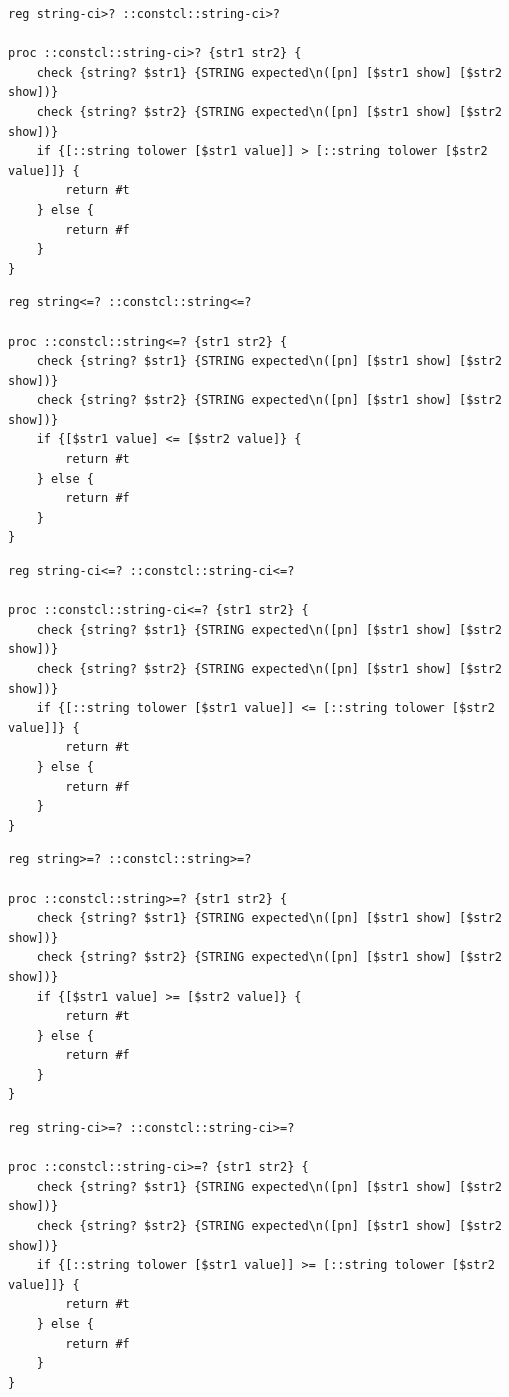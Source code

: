 \documentclass[twoside,9pt]{report}
\begin{document}
\noindent\makebox[\linewidth]{\rule{\linewidth}{0.4pt}}
\noindent\makebox[\linewidth]{\rule{\linewidth}{0.4pt}}
\begin{lstlisting}
reg string-ci>? ::constcl::string-ci>?
 
proc ::constcl::string-ci>? {str1 str2} {
    check {string? $str1} {STRING expected\n([pn] [$str1 show] [$str2 show])}
    check {string? $str2} {STRING expected\n([pn] [$str1 show] [$str2 show])}
    if {[::string tolower [$str1 value]] > [::string tolower [$str2 value]]} {
        return #t
    } else {
        return #f
    }
}
\end{lstlisting}
\noindent\makebox[\linewidth]{\rule{\linewidth}{0.4pt}}
\noindent\makebox[\linewidth]{\rule{\linewidth}{0.4pt}}
\begin{lstlisting}
reg string<=? ::constcl::string<=?
 
proc ::constcl::string<=? {str1 str2} {
    check {string? $str1} {STRING expected\n([pn] [$str1 show] [$str2 show])}
    check {string? $str2} {STRING expected\n([pn] [$str1 show] [$str2 show])}
    if {[$str1 value] <= [$str2 value]} {
        return #t
    } else {
        return #f
    }
}
\end{lstlisting}
\noindent\makebox[\linewidth]{\rule{\linewidth}{0.4pt}}
\noindent\makebox[\linewidth]{\rule{\linewidth}{0.4pt}}
\begin{lstlisting}
reg string-ci<=? ::constcl::string-ci<=?
 
proc ::constcl::string-ci<=? {str1 str2} {
    check {string? $str1} {STRING expected\n([pn] [$str1 show] [$str2 show])}
    check {string? $str2} {STRING expected\n([pn] [$str1 show] [$str2 show])}
    if {[::string tolower [$str1 value]] <= [::string tolower [$str2 value]]} {
        return #t
    } else {
        return #f
    }
}
\end{lstlisting}
\noindent\makebox[\linewidth]{\rule{\linewidth}{0.4pt}}
\noindent\makebox[\linewidth]{\rule{\linewidth}{0.4pt}}
\begin{lstlisting}
reg string>=? ::constcl::string>=?
 
proc ::constcl::string>=? {str1 str2} {
    check {string? $str1} {STRING expected\n([pn] [$str1 show] [$str2 show])}
    check {string? $str2} {STRING expected\n([pn] [$str1 show] [$str2 show])}
    if {[$str1 value] >= [$str2 value]} {
        return #t
    } else {
        return #f
    }
}
\end{lstlisting}
\noindent\makebox[\linewidth]{\rule{\linewidth}{0.4pt}}
\noindent\makebox[\linewidth]{\rule{\linewidth}{0.4pt}}
\begin{lstlisting}
reg string-ci>=? ::constcl::string-ci>=?
 
proc ::constcl::string-ci>=? {str1 str2} {
    check {string? $str1} {STRING expected\n([pn] [$str1 show] [$str2 show])}
    check {string? $str2} {STRING expected\n([pn] [$str1 show] [$str2 show])}
    if {[::string tolower [$str1 value]] >= [::string tolower [$str2 value]]} {
        return #t
    } else {
        return #f
    }
}
\end{lstlisting}
\noindent\makebox[\linewidth]{\rule{\linewidth}{0.4pt}}
\end{document}
